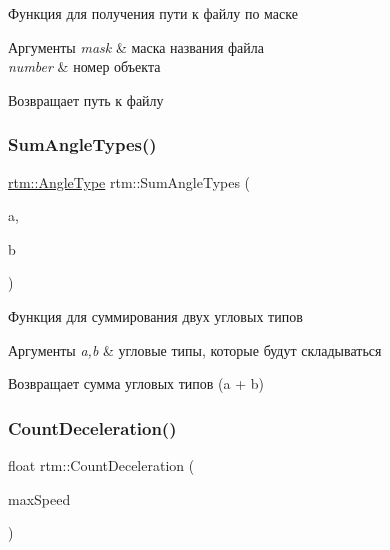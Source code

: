 Функция для получения пути к файлу по маске 


\begin{DoxyParams}{Аргументы}
{\em mask} & маска названия файла \\
\hline
{\em number} & номер объекта \\
\hline
\end{DoxyParams}
\begin{DoxyReturn}{Возвращает}
путь к файлу 
\end{DoxyReturn}
\mbox{\label{namespacertm_ac1ea2821fc44943e5c35d92e0c9cd5de}} 
\subsubsection{\texorpdfstring{Sum\+Angle\+Types()}{SumAngleTypes()}}
{\footnotesize\ttfamily \hyperlink{namespacertm_a69dc82b16a0148c10962caa83d930f89}{rtm\+::\+Angle\+Type} rtm\+::\+Sum\+Angle\+Types (\begin{DoxyParamCaption}\item[{\hyperlink{namespacertm_a69dc82b16a0148c10962caa83d930f89}{Angle\+Type}}]{a,  }\item[{\hyperlink{namespacertm_a69dc82b16a0148c10962caa83d930f89}{Angle\+Type}}]{b }\end{DoxyParamCaption})}



Функция для суммирования двух угловых типов 


\begin{DoxyParams}{Аргументы}
{\em a,b} & угловые типы, которые будут складываться \\
\hline
\end{DoxyParams}
\begin{DoxyReturn}{Возвращает}
сумма угловых типов (a + b) 
\end{DoxyReturn}
\mbox{\label{namespacertm_a37715773d85c66ba5c1bf11260836fd0}} 
\subsubsection{\texorpdfstring{Count\+Deceleration()}{CountDeceleration()}}
{\footnotesize\ttfamily float rtm\+::\+Count\+Deceleration (\begin{DoxyParamCaption}\item[{float}]{max\+Speed }\end{DoxyParamCaption})}



